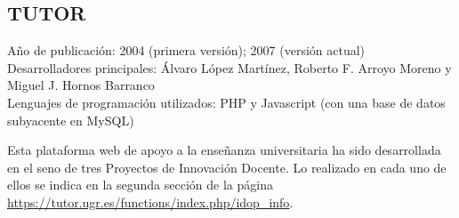\subsection{TUTOR}

Año de publicación: 2004 (primera versión); 2007 (versión actual)\\

Desarrolladores principales: Álvaro López Martínez, Roberto F. Arroyo Moreno y Miguel J. Hornos Barranco\\

Lenguajes de programación utilizados: PHP y Javascript (con una base de datos subyacente en MySQL)

\bigskip
Esta plataforma web de apoyo a la enseñanza universitaria ha sido desarrollada en el seno de tres Proyectos de Innovación Docente. Lo realizado en cada uno de ellos se indica en la segunda sección de la página \url{https://tutor.ugr.es/functions/index.php/idop_info}.
